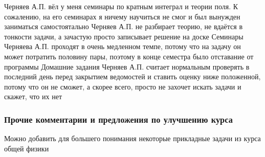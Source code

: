             \begin{commentbox} 
                Черняев А.П. вёл у меня семинары по кратным интеграл и теории поля. К сожалению, на его семинарах я ничему научиться не смог и был вынужден заниматься самостоятально 
                Черняев А.П. не разбирает теорию, не вдаётся в тонкости задачи, а зачастую просто записывает решение на доске
                Семинары Черняева А.П. проходят в очень медленном темпе, потому что на задачу он может потратить половину пары, поэтому в конце семестра было отставание от программы
                Домашние задания Черняев А.П. считает нормальным проверять в последний день перед закрытием ведомостей и ставить оценку ниже положенной, потому что он не сможет, а скорее всего, просто не захочет искать задачи и скажет, что их нет 
            \end{commentbox} 
        

    \subsubsection{Прочие комментарии и предложения по улучшению курса}
        \begin{commentbox}
            Можно добавить для большего понимания некоторые прикладные задачи из курса общей физики
        \end{commentbox}